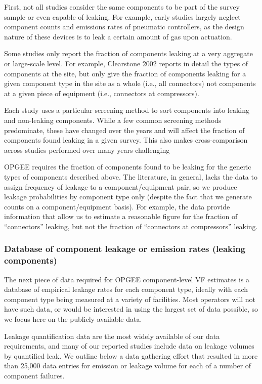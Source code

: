 \documentclass[11pt]{report}
\begin{document}
First, not all studies consider the same components to be part of the survey sample or even capable of leaking. For example, early studies largely neglect component counts and emissions rates of pneumatic controllers, as the design nature of these devices is to leak a certain amount of gas upon actuation.

Some studies only report the fraction of components leaking at a very aggregate or large-scale level. For example, Clearstone 2002 reports in detail the types of components at the site, but only give the fraction of components leaking for a given component type in the site as a whole (i.e., all connectors) not components at a given piece of equipment (i.e., connectors at compressors).

Each study uses a particular screening method to sort components into leaking and non-leaking components. While a few common screening methods predominate, these have changed over the years and will affect the fraction of components found leaking in a given survey. This also makes cross-comparison across studies performed over many years challenging

OPGEE requires the fraction of components found to be leaking for the generic types of components described above. The literature, in general, lacks the data to assign frequency of leakage to a component/equipment pair, so we produce leakage probabilities by component type only (despite the fact that we generate counts on a component/equipment basis). For example, the data provide information that allow us to estimate a reasonable figure for the fraction of ``connectors'' leaking, but not the fraction of ``connectors at compressors'' leaking.


\subsubsection{Database of component leakage or emission rates (leaking components)}

The next piece of data required for OPGEE component-level VF estimates is a database of empirical leakage rates for each component type, ideally with each component type being measured at a variety of facilities.  Most operators will not have such data, or would be interested in using the largest set of data possible, so we focus here on the publicly available data.

Leakage quantification data are the most widely available of our data requirements, and many of our reported studies include data on leakage volumes by quantified leak. We outline below a data gathering effort that resulted in more than 25,000 data entries for emission or leakage volume for each of a number of component failures.  
\end{document}
